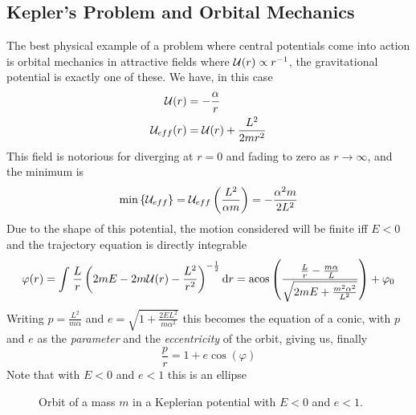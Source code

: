 \documentclass[../admech.tex]{subfiles}
\begin{document}
\subsection{Kepler's Problem and Orbital Mechanics}
The best physical example of a problem where central potentials come into action is orbital mechanics in attractive fields where $\mathcal{U}(r)\propto r^{-1}$, the gravitational potential is exactly one of these. We have, in this case
\begin{equation}
	\begin{aligned}
		\mathcal{U}(r)&=-\frac{\alpha}{r}\\
		\mathcal{U}_{eff}(r)&=\mathcal{U}(r)+\frac{L^2}{2mr^2}
	\end{aligned}
	\label{eq:keplerpot}
\end{equation}
This field is notorious for diverging at $r=0$ and fading to zero as $r\to\infty$, and the minimum is
\begin{equation*}
	\min\left\{ \mathcal{U}_{eff} \right\}=\mathcal{U}_{eff}\left( \frac{L^2}{\alpha m} \right)=-\frac{\alpha^2 m}{2L^2}
\end{equation*}
Due to the shape of this potential, the motion considered will be finite iff $E<0$ and the trajectory equation is directly integrable
\begin{equation}
	\varphi(r)=\int_{}^{}\frac{L}{r}\left( 2mE-2m\pot(r)-\frac{L^2}{r^2} \right)^{-\frac{1}{2}}\dd{r}=\acos\left( \frac{\frac{L}{r}-\frac{m\alpha}{L}}{\sqrt{2mE+\frac{m^2\alpha^2}{L^2}}} \right)+\varphi_0
	\label{eq:orbiteqkepler}
\end{equation}
Writing $p=\frac{L^2}{m\alpha}$ and $e=\sqrt{1+\frac{2EL^2}{m\alpha^2}}$ this becomes the equation of a conic, with $p$ and $e$ as the \emph{parameter} and the \emph{eccentricity} of the orbit, giving us, finally
\begin{equation}
	\frac{p}{r}=1+e\cos(\varphi)
	\label{eq:ellipseeqorb}
\end{equation}
Note that with $E<0$ and $e<1$ this is an ellipse
\begin{figure}[H]
	\centering
	\caption{Orbit of a mass $m$ in a Keplerian potential with $E<0$ and $e<1$.}
	\label{fig:ellipseorbit}
\end{figure}
\end{document}
